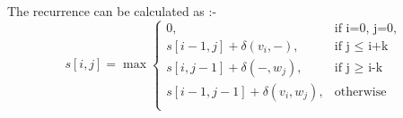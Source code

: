 \begin{enumerate}
{{The recurrence can be calculated as :-\\
\begin{equation*}
s[i,j] = \max
\begin{cases}
  0, & \mbox{if i=0, j=0,}\\
  s[i-1,j] + \delta(v_i, -), & \mbox{if j $\le$ i+k }\\
  s[i,j-1] + \delta(-, w_j), & \mbox{if j $\ge$ i-k }\\
  s[i-1,j-1] + \delta(v_i, w_j), & \mbox{otherwise }\\
\end{cases}
\end{equation*}
\vspace{.8cm}

}}
\end{enumerate}

\clearpage

